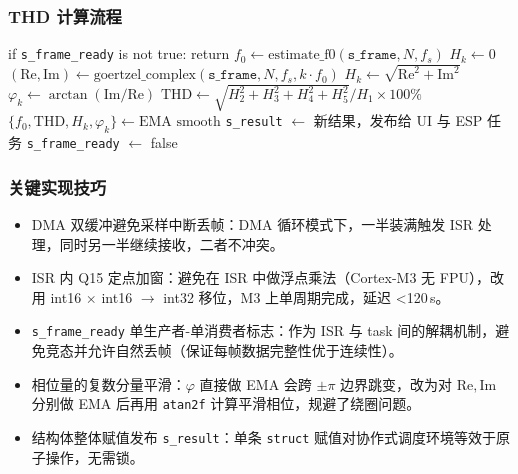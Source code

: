 \documentclass[a4paper]{article}
\begin{document}
	\subsubsection{THD 计算流程}

	\begin{algorithm}[H]
	\caption{THD 单帧处理流程（简化伪代码）}
	\begin{algorithmic}[1]
		\STATE if \texttt{s\_frame\_ready} is not true: return
		\STATE $f_0 \leftarrow \text{estimate\_f0}(\texttt{s\_frame}, N, f_s)$    
				\STATE $H_k \leftarrow 0$    
			\ELSE
				\STATE $(\mathrm{Re}, \mathrm{Im}) \leftarrow \text{goertzel\_complex}(\texttt{s\_frame}, N, f_s, k \cdot f_0)$
				\STATE $H_k \leftarrow \sqrt{\mathrm{Re}^2 + \mathrm{Im}^2}$
				\STATE $\varphi_k \leftarrow \arctan(\mathrm{Im} / \mathrm{Re})$
			\ENDIF
		\ENDFOR
		\STATE $\mathrm{THD} \leftarrow \sqrt{H_2^2 + H_3^2 + H_4^2 + H_5^2} / H_1 \times 100\%$
		\STATE $\{f_0, \mathrm{THD}, H_k, \varphi_k\} \leftarrow \text{EMA smooth}$
		\STATE \texttt{s\_result} $\leftarrow$ 新结果，发布给 UI 与 ESP 任务
		\STATE \texttt{s\_frame\_ready} $\leftarrow$ false
	\end{algorithmic}
	\end{algorithm}

	\subsubsection{关键实现技巧}

	\begin{itemize}[leftmargin=2em]
		\item DMA 双缓冲避免采样中断丢帧：DMA 循环模式下，一半装满触发 ISR 处理，同时另一半继续接收，二者不冲突。
		\item ISR 内 Q15 定点加窗：避免在 ISR 中做浮点乘法（Cortex-M3 无 FPU），改用 int16 $\times$ int16 $\rightarrow$ int32 移位，M3 上单周期完成，延迟 <120\,\textmu s。
		\item \texttt{s\_frame\_ready} 单生产者-单消费者标志：作为 ISR 与 task 间的解耦机制，避免竞态并允许自然丢帧（保证每帧数据完整性优于连续性）。
		\item 相位量的复数分量平滑：$\varphi$ 直接做 EMA 会跨 $\pm \pi$ 边界跳变，改为对 $\mathrm{Re}, \mathrm{Im}$ 分别做 EMA 后再用 \texttt{atan2f} 计算平滑相位，规避了绕圈问题。
		\item 结构体整体赋值发布 \texttt{s\_result}：单条 \texttt{struct} 赋值对协作式调度环境等效于原子操作，无需锁。
	\end{itemize}
\end{document}
